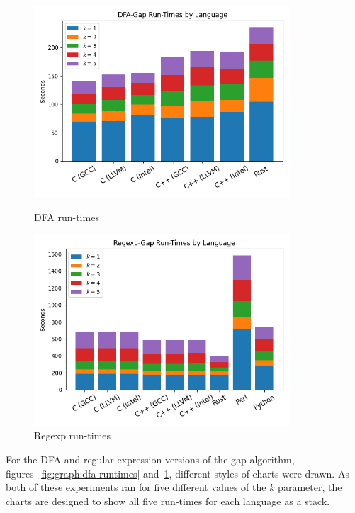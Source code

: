 \begin{figure}[ht]
    \centering
    \begin{minipage}[t]{0.45\textwidth}
        \centering
        \includegraphics[width=0.85\textwidth]{figures/algorithm_runtimes-dfa_gap.png}
        \caption[DFA-Gap run-times]{DFA run-times}
        \label{fig:graph:dfa-runtimes}
    \end{minipage}\hfill
    \begin{minipage}[t]{0.45\textwidth}
        \centering
        \includegraphics[width=0.85\textwidth]{figures/algorithm_runtimes-regexp.png}
        \caption[Regexp-Gap run-times]{Regexp run-times}
        \label{fig:graph:regexp-runtimes}
    \end{minipage}
\end{figure}

For the DFA and regular expression versions of the gap algorithm, figures~\ref{fig:graph:dfa-runtimes} and~\ref{fig:graph:regexp-runtimes}, different styles of charts were drawn. As both of these experiments ran for five different values of the $k$ parameter, the charts are designed to show all five run-times for each language as a stack.

